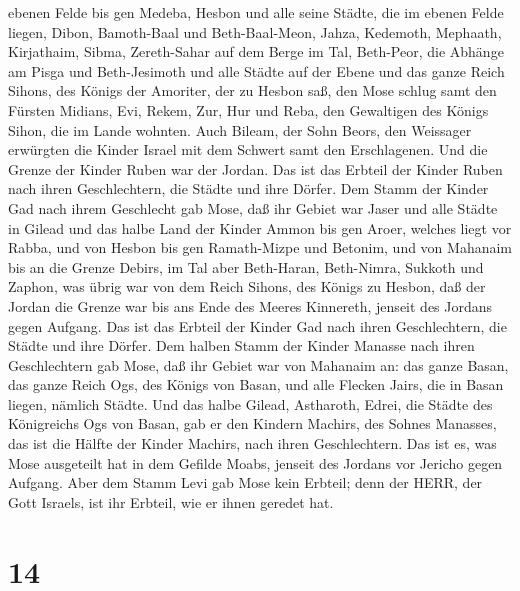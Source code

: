 ebenen Felde bis gen Medeba,  Hesbon und alle seine Städte,
die im ebenen Felde liegen, Dibon, Bamoth-Baal und Beth-Baal-Meon,
 Jahza, Kedemoth, Mephaath,  Kirjathaim,
Sibma, Zereth-Sahar auf dem Berge im Tal,  Beth-Peor, die
Abhänge am Pisga und Beth-Jesimoth  und alle Städte auf der
Ebene und das ganze Reich Sihons, des Königs der Amoriter, der zu Hesbon
saß, den Mose schlug samt den Fürsten Midians, Evi, Rekem, Zur, Hur und
Reba, den Gewaltigen des Königs Sihon, die im Lande wohnten.
 Auch Bileam, der Sohn Beors, den Weissager erwürgten die
Kinder Israel mit dem Schwert samt den Erschlagenen.  Und
die Grenze der Kinder Ruben war der Jordan. Das ist das Erbteil der
Kinder Ruben nach ihren Geschlechtern, die Städte und ihre Dörfer.
 Dem Stamm der Kinder Gad nach ihrem Geschlecht gab Mose,
 daß ihr Gebiet war Jaser und alle Städte in Gilead und das
halbe Land der Kinder Ammon bis gen Aroer, welches liegt vor Rabba,
 und von Hesbon bis gen Ramath-Mizpe und Betonim, und von
Mahanaim bis an die Grenze Debirs,  im Tal aber Beth-Haran,
Beth-Nimra, Sukkoth und Zaphon, was übrig war von dem Reich Sihons, des
Königs zu Hesbon, daß der Jordan die Grenze war bis ans Ende des Meeres
Kinnereth, jenseit des Jordans gegen Aufgang.  Das ist das
Erbteil der Kinder Gad nach ihren Geschlechtern, die Städte und ihre
Dörfer.  Dem halben Stamm der Kinder Manasse nach ihren
Geschlechtern gab Mose,  daß ihr Gebiet war von Mahanaim
an: das ganze Basan, das ganze Reich Ogs, des Königs von Basan, und alle
Flecken Jairs, die in Basan liegen, nämlich Städte.  Und
das halbe Gilead, Astharoth, Edrei, die Städte des Königreichs Ogs von
Basan, gab er den Kindern Machirs, des Sohnes Manasses, das ist die
Hälfte der Kinder Machirs, nach ihren Geschlechtern.  Das
ist es, was Mose ausgeteilt hat in dem Gefilde Moabs, jenseit des
Jordans vor Jericho gegen Aufgang.  Aber dem Stamm Levi gab
Mose kein Erbteil; denn der HERR, der Gott Israels, ist ihr Erbteil, wie
er ihnen geredet hat.

\hypertarget{section-13}{%
\section{14}\label{section-13}}


